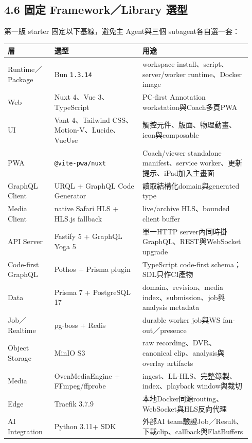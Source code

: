 \documentclass[
  9pt,
  a4paper,
]{article}
\begin{document}
\subsection{4.6 固定 Framework／Library
選型}\label{46-ux56faux5b9a-frameworklibrary-ux9078ux578b}

第一版 starter 固定以下基線，避免主 Agent與三個 subagent各自選一套：

\begin{longtable}[]{@{}>{\RaggedRight\arraybackslash}p{0.18\linewidth}>{\RaggedRight\arraybackslash}p{0.34\linewidth}>{\RaggedRight\arraybackslash}p{0.42\linewidth}@{}}
\toprule\noalign{}
層 & 選型 & 用途 \\
\midrule\noalign{}
\endhead
\bottomrule\noalign{}
\endlastfoot
Runtime／Package & Bun \texttt{1.3.14} & workspace
install、script、server/worker runtime、Docker image \\
Web & Nuxt 4、Vue 3、TypeScript & PC-first Annotation workstation與Coach多頁PWA \\
UI & Vant 4、Tailwind CSS、Motion-V、Lucide、VueUse &
觸控元件、版面、物理動畫、icon與composable \\
PWA & \texttt{@vite-pwa/nuxt} & Coach/viewer standalone manifest、service
worker、更新提示、iPad加入主畫面 \\
GraphQL Client & URQL + GraphQL Code Generator &
讀取結構化domain與generated type \\
Media Client & native Safari HLS + HLS.js fallback & live/archive
HLS、bounded client buffer \\
API Server & Fastify 5 + GraphQL Yoga 5 & 單一HTTP
server內同時掛GraphQL、REST與WebSocket upgrade \\
Code-first GraphQL & Pothos + Prisma plugin & TypeScript code-first
schema；SDL只作CI產物 \\
Data & Prisma 7 + PostgreSQL 17 & domain、revision、media
index、submission、job與analysis metadata \\
Job／Realtime & pg-boss + Redis & durable worker job與WS
fan-out／presence \\
Object Storage & MinIO S3 & raw recording、DVR、canonical
clip、analysis與overlay artifacts \\
Media & OvenMediaEngine + FFmpeg/ffprobe &
ingest、LL-HLS、完整錄製、index、playback window與裁切 \\
Edge & Traefik 3.7.9 & 本地Docker同源routing、WebSocket與HLS反向代理 \\
AI Integration & Python 3.11+ SDK & 外部AI
team驗證Job／Result、下載clip、callback與FlatBuffers \\
\end{longtable}
\end{document}

